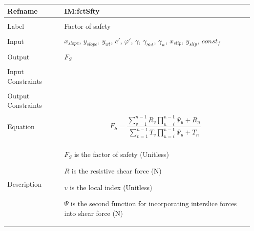 \documentclass[12pt]{article}
\begin{document}
\noindent \begin{minipage}{\textwidth}
\begin{tabular}{p{} p{}}
\toprule \textbf{Refname} & \textbf{IM:fctSfty}
\label{IM:fctSfty}
\\ \midrule \\
Label & Factor of safety
        \\ \midrule \\
        Input & ${x_{slope}}$, ${y_{slope}}$, ${y_{wt}}$, $c'$, $φ'$, $γ$, ${γ_{Sat}}$, ${γ_{w}}$, ${x_{slip}}$, ${y_{slip}}$, $const_f$
                \\ \midrule \\
                Output & ${F_{S}}$
                         \\ \midrule \\
                         Input Constraints & \\ \midrule \\
                                             Output Constraints & \\ \midrule \\
                                                                  Equation & \begin{displaymath}
                                                                             {F_{S}}=\frac{\displaystyle\sum_{v=1}^{n-1}{R_{v} \displaystyle\prod_{u=i}^{n-1}{Ψ_{u}}}+R_{n}}{\displaystyle\sum_{v=1}^{n-1}{T_{v} \displaystyle\prod_{u=i}^{n-1}{Ψ_{u}}}+T_{n}}
                                                                             \end{displaymath}
                                                                             \\ \midrule \\
                                                                             Description & \begin{symbDescription}
                                                                                           \item{${F_{S}}$ is the factor of safety (Unitless)}
                                                                                           \item{$R$ is the resistive shear force (N)}
                                                                                           \item{$v$ is the local index (Unitless)}
                                                                                           \item{$Ψ$ is the second function for incorporating interslice forces into shear force (N)}

\end{symbDescription}
\end{tabular}
\end{minipage}
\end{document}
